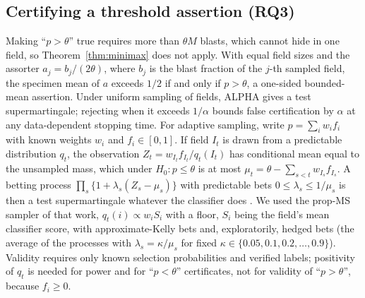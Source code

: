 \documentclass[preprint,12pt]{elsarticle}
\theoremstyle{remark}
\theoremstyle{definition}
\begin{document}
\subsection{Certifying a threshold assertion (RQ3)}
Making ``$p>\theta$'' true requires more than $\theta M$ blasts, which cannot hide in one field, so Theorem~\ref{thm:minimax} does not apply. With equal field sizes and the assorter $a_j=b_j/(2\theta)$, where $b_j$ is the blast fraction of the $j$-th sampled field, the specimen mean of $a$ exceeds $1/2$ if and only if $p>\theta$, a one-sided bounded-mean assertion. Under uniform sampling of fields, ALPHA \cite{stark2023alpha} gives a test supermartingale; rejecting when it exceeds $1/\alpha$ bounds false certification by $\alpha$ at any data-dependent stopping time. For adaptive sampling, write $p=\sum_iw_if_i$ with known weights $w_i$ and $f_i\in[0,1]$. If field $I_t$ is drawn from a predictable distribution $q_t$, the observation $Z_t=w_{I_t}f_{I_t}/q_t(I_t)$ has conditional mean equal to the unsampled mass, which under $H_0\colon p\le\theta$ is at most $\mu_t=\theta-\sum_{s<t}w_{I_s}f_{I_s}$. A betting process $\prod_s\{1+\lambda_s(Z_s-\mu_s)\}$ with predictable bets $0\le\lambda_s\le1/\mu_s$ is then a test supermartingale whatever the classifier does \cite{shekhar2023rlfa}. We used the prop-MS sampler of that work, $q_t(i)\propto w_iS_i$ with a floor, $S_i$ being the field's mean classifier score, with approximate-Kelly bets and, exploratorily, hedged bets (the average of the processes with $\lambda_s=\kappa/\mu_s$ for fixed $\kappa\in\{0.05,0.1,0.2,\dots,0.9\}$). Validity requires only known selection probabilities and verified labels; positivity of $q_t$ is needed for power and for ``$p<\theta$'' certificates, not for validity of ``$p>\theta$'', because $f_i\ge0$.
\end{document}
